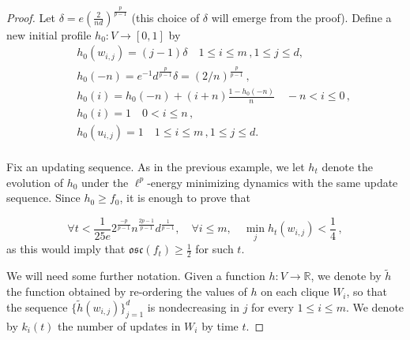 \documentclass[10pt,a4paper]{amsart}
\newcommand{\R}{\mathbb{R}}
\newcommand{\osc}{\mathfrak{osc}}
\begin{document}
\begin{proof}
Let $\delta =   e\left(\frac{2}{nd}\right)^{\frac{p}{p-1}} $
(this choice of $\delta$ will emerge from the proof). 
Define a new initial profile $h_0:V\rightarrow [0,1]$ by 
    \begin{eqnarray*}
        &&h_0(w_{i,j}) = (j-1) \delta \quad 1\leq i\leq m\, , 1\leq j \leq d ,\\
        &&h_0(-n)=e^{-1} d^\frac{p}{p-1}\delta=  (2/n)^{\frac{p}{p-1}}\, ,\\
        &&h_0(i) = h_0(-n) + (i+n)\frac{1-h_0(-n)}{n} \quad -n<i\leq 0 \, , \\
        &&h_0(i) = 1 \quad 0<i\leq n \, ,\\
        &&h_0(u_{i,j}) = 1 \quad 1\leq i\leq m\, , 1\leq j \leq d .\\
    \end{eqnarray*}
    
Fix an updating sequence. As in the previous example, we let $h_t$ denote the evolution of $h_0$ under the $\ell^p$-energy minimizing dynamics with the same update sequence. 
Since $h_0\geq f_0$, it is enough to prove that 

\begin{equation}\label{eq:large D main}  \forall t<\frac{1}{25e} 2^\frac{-p}{p-1}n^\frac{2p-1}{p-1}d^\frac{1}{p-1},\quad  \forall i\le m, \quad  \min_j h_t(w_{i,j})<\frac{1}{4} \, ,\end{equation}  
as this would imply that $\osc(f_t)\geq \frac{1}{2}$ for such $t$.

We will need  some further notation. 
Given  a function $h:V\rightarrow \R$, we denote by $\widetilde{h}$ the function obtained by re-ordering the values of $h$ on each clique $W_i$, so that the sequence $\{\widetilde{h}(w_{i,j})\}_{j=1}^d$ is nondecreasing in $j$ for every $1\leq i\leq m$. 
We denote by $k_i(t)$ the number of updates in $W_i$ by time $t$. 


\end{proof}
\end{document}
